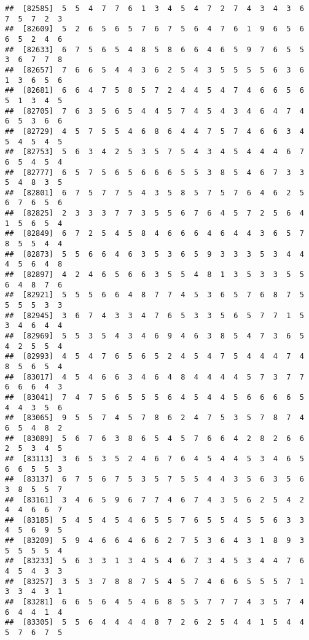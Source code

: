 \documentclass[
]{book}
\begin{document}
\begin{verbatim}
##  [82585]  5  5  4  7  7  6  1  3  4  5  4  7  2  7  4  3  4  3  6  7  5  7  2  3
##  [82609]  5  2  6  5  6  5  7  6  7  5  6  4  7  6  1  9  6  5  6  6  5  2  4  6
##  [82633]  6  7  5  6  5  4  8  5  8  6  6  4  6  5  9  7  6  5  5  3  6  7  7  8
##  [82657]  7  6  6  5  4  4  3  6  2  5  4  3  5  5  5  5  6  3  6  1  3  6  5  6
##  [82681]  6  6  4  7  5  8  5  7  2  4  4  5  4  7  4  6  6  5  6  5  1  3  4  5
##  [82705]  7  6  3  5  6  5  4  4  5  7  4  5  4  3  4  6  4  7  4  6  5  3  6  6
##  [82729]  4  5  7  5  5  4  6  8  6  4  4  7  5  7  4  6  6  3  4  5  4  5  4  5
##  [82753]  5  6  3  4  2  5  3  5  7  5  4  3  4  5  4  4  4  6  7  6  5  4  5  4
##  [82777]  6  5  7  5  6  5  6  6  6  5  5  3  8  5  4  6  7  3  3  5  4  8  3  5
##  [82801]  6  7  5  7  7  5  4  3  5  8  5  7  5  7  6  4  6  2  5  6  7  6  5  6
##  [82825]  2  3  3  3  7  7  3  5  5  6  7  6  4  5  7  2  5  6  4  1  5  6  5  4
##  [82849]  6  7  2  5  4  5  8  4  6  6  6  4  6  4  4  3  6  5  7  8  5  5  4  4
##  [82873]  5  5  6  6  4  6  3  5  3  6  5  9  3  3  3  5  3  4  4  4  5  6  4  8
##  [82897]  4  2  4  6  5  6  6  3  5  5  4  8  1  3  5  3  3  5  5  6  4  8  7  6
##  [82921]  5  5  5  6  6  4  8  7  7  4  5  3  6  5  7  6  8  7  5  5  5  5  3  3
##  [82945]  3  6  7  4  3  3  4  7  6  5  3  3  5  6  5  7  7  1  5  3  4  6  4  4
##  [82969]  5  5  3  5  4  3  4  6  9  4  6  3  8  5  4  7  3  6  5  4  2  5  5  4
##  [82993]  4  5  4  7  6  5  6  5  2  4  5  4  7  5  4  4  4  7  4  8  5  6  5  4
##  [83017]  4  5  4  6  6  3  4  6  4  8  4  4  4  4  5  7  3  7  7  6  6  6  4  3
##  [83041]  7  4  7  5  6  5  5  5  6  4  5  4  4  5  6  6  6  6  5  4  4  3  5  6
##  [83065]  9  5  5  7  4  5  7  8  6  2  4  7  5  3  5  7  8  7  4  6  5  4  8  2
##  [83089]  5  6  7  6  3  8  6  5  4  5  7  6  6  4  2  8  2  6  6  2  5  3  4  5
##  [83113]  3  6  5  3  5  2  4  6  7  6  4  5  4  4  5  3  4  6  5  6  6  5  5  3
##  [83137]  6  7  5  6  7  5  3  5  7  5  5  4  4  3  5  6  3  5  6  3  8  5  5  7
##  [83161]  3  4  6  5  9  6  7  7  4  6  7  4  3  5  6  2  5  4  2  4  4  6  6  7
##  [83185]  5  4  5  4  5  4  6  5  5  7  6  5  5  4  5  5  6  3  3  4  5  6  9  5
##  [83209]  5  9  4  6  6  4  6  6  2  7  5  3  6  4  3  1  8  9  3  5  5  5  5  4
##  [83233]  5  6  3  3  1  3  4  5  4  6  7  3  4  5  3  4  4  7  6  4  5  4  3  3
##  [83257]  3  5  3  7  8  8  7  5  4  5  7  4  6  6  5  5  5  7  1  3  3  4  3  1
##  [83281]  6  6  5  6  4  5  4  6  8  5  5  7  7  7  4  3  5  7  4  6  4  4  1  4
##  [83305]  5  5  6  4  4  4  4  8  7  2  6  2  5  4  4  1  5  4  4  5  7  6  7  5

\end{verbatim}
\end{document}
